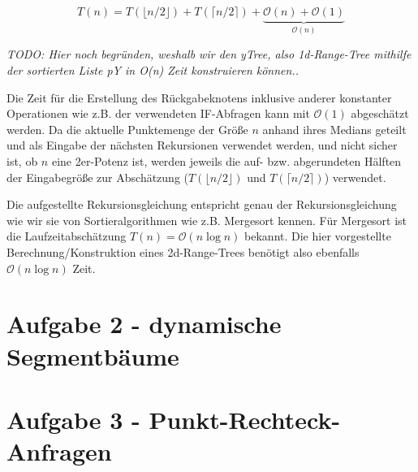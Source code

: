 \documentclass[a4paper]{article}
\begin{document}
$$T(n) = T(\lfloor n/2\rfloor) + T(\lceil n/2\rceil) + \underbrace{\mathcal{O}(n) + \mathcal{O}(1)}_{\mathcal{O}(n)}$$

\textit{TODO: Hier noch begründen, weshalb wir den yTree, also 1d-Range-Tree mithilfe der 
sortierten Liste pY in O(n) Zeit konstruieren können..}

 Die Zeit für die Erstellung des Rückgabeknotens inklusive anderer
konstanter Operationen wie z.B. der verwendeten IF-Abfragen kann mit $\mathcal{O}(1)$ abgeschätzt
werden. Da die aktuelle Punktemenge der Größe $n$ anhand ihres Medians geteilt und als Eingabe der
nächsten Rekursionen verwendet werden, und nicht sicher ist, ob $n$ eine 2er-Potenz ist, werden
jeweils die auf- bzw. abgerundeten Hälften der Eingabegröße zur Abschätzung ($T(\lfloor n/2\rfloor)$  und $T(\lceil n/2\rceil)$) verwendet. 

Die aufgestellte Rekursionsgleichung entspricht genau der Rekursionsgleichung wie wir sie von Sortieralgorithmen wie z.B. Mergesort kennen. Für Mergesort ist die Laufzeitabschätzung 
$T(n) = \mathcal{O}(n \log n)$ bekannt. Die hier vorgestellte Berechnung/Konstruktion eines
2d-Range-Trees benötigt also ebenfalls $\mathcal{O}(n \log n)$ Zeit.

\section*{Aufgabe 2 - dynamische Segmentbäume}
\section*{Aufgabe 3 - Punkt-Rechteck-Anfragen}
\end{document}

